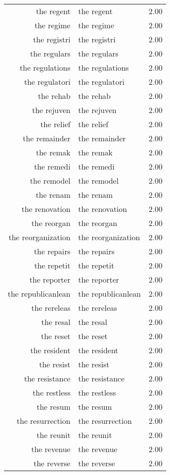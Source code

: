 \begin{table}[ht]
\begin{tabular}{rlr}
  the regent & the regent & 2.00 \\ 
  the regime & the regime & 2.00 \\ 
  the registri & the registri & 2.00 \\ 
  the regulars & the regulars & 2.00 \\ 
  the regulations & the regulations & 2.00 \\ 
  the regulatori & the regulatori & 2.00 \\ 
  the rehab & the rehab & 2.00 \\ 
  the rejuven & the rejuven & 2.00 \\ 
  the relief & the relief & 2.00 \\ 
  the remainder & the remainder & 2.00 \\ 
  the remak & the remak & 2.00 \\ 
  the remedi & the remedi & 2.00 \\ 
  the remodel & the remodel & 2.00 \\ 
  the renam & the renam & 2.00 \\ 
  the renovation & the renovation & 2.00 \\ 
  the reorgan & the reorgan & 2.00 \\ 
  the reorganization & the reorganization & 2.00 \\ 
  the repairs & the repairs & 2.00 \\ 
  the repetit & the repetit & 2.00 \\ 
  the reporter & the reporter & 2.00 \\ 
  the republicanlean & the republicanlean & 2.00 \\ 
  the rereleas & the rereleas & 2.00 \\ 
  the resal & the resal & 2.00 \\ 
  the reset & the reset & 2.00 \\ 
  the resident & the resident & 2.00 \\ 
  the resist & the resist & 2.00 \\ 
  the resistance & the resistance & 2.00 \\ 
  the restless & the restless & 2.00 \\ 
  the resum & the resum & 2.00 \\ 
  the resurrection & the resurrection & 2.00 \\ 
  the reunit & the reunit & 2.00 \\ 
  the revenue & the revenue & 2.00 \\ 
  the reverse & the reverse & 2.00 \\ 

\end{tabular}
\end{table}
